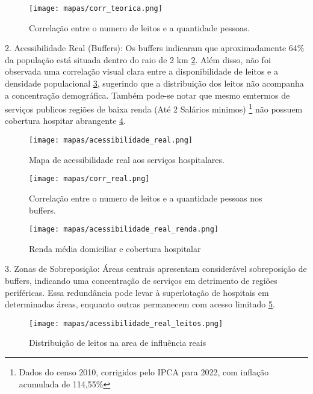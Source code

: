 \documentclass[
  8pt,
]{article}
\begin{document}
\begin{multicols}{2}
\begin{figure}[H]
    \centering
    \texttt{[image: mapas/corr\_teorica.png]}
    \caption{Correlação entre o numero de leitos e a quantidade pessoas.}
    \label{fig:corr_teorica}
\end{figure}

2. Acessibilidade Real (Buffers): Os buffers indicaram que aproximadamente 64\% da população está situada dentro do raio de 2 km \cref{fig:acessibilidade_real}. Além disso, não foi observada uma correlação visual clara entre a disponibilidade de leitos e a densidade populacional \cref{fig:corr_real}, sugerindo que a distribuição dos leitos não acompanha a concentração demográfica. Também pode-se notar que mesmo emtermos de serviços publicos regiões de baixa renda (Até 2 Salários minimos) \footnote{Dados do censo 2010, corrigidos pelo IPCA para 2022, com inflação acumulada de 114,55\%} não possuem cobertura hospitar abrangente \cref{fig:acessibilidade_real_renda}.

\begin{figure}[H]
    \centering
    \texttt{[image: mapas/acessibilidade\_real.png]}
    \caption{Mapa de acessibilidade real aos serviços hospitalares.}
    \label{fig:acessibilidade_real}
\end{figure}

\begin{figure}[H]
    \centering
    \texttt{[image: mapas/corr\_real.png]}
    \caption{Correlação entre o numero de leitos e a quantidade pessoas nos buffers.}
    \label{fig:corr_real}
\end{figure}

\begin{figure}[H]
    \centering
    \texttt{[image: mapas/acessibilidade\_real\_renda.png]}
    \caption{Renda média domiciliar e cobertura hospitalar}
    \label{fig:acessibilidade_real_renda}
\end{figure}

3. Zonas de Sobreposição: Áreas centrais apresentam considerável sobreposição de buffers, indicando uma concentração de serviços em detrimento de regiões periféricas. Essa redundância pode levar à superlotação de hospitais em determinadas áreas, enquanto outras permanecem com acesso limitado \ref{fig:acessibilidade_real_leitos}.

\begin{figure}[H]
    \centering
    \texttt{[image: mapas/acessibilidade\_real\_leitos.png]}
    \caption{Distribuição de leitos na area de influência reais}
    \label{fig:acessibilidade_real_leitos}
\end{figure}



\end{multicols}
\end{document}
